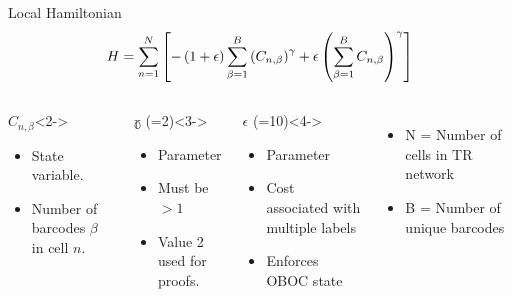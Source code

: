 \documentclass[10pt]{beamer}
\begin{document}
\begin{frame}{Local Hamiltonian}
    \begin{equation*}
        \centering
        H = \sum^{N}_{n=1} \left[
        - \left( 1 + \epsilon \right) \sum^{B}_{\beta=1}
        \left( C_{n , \beta} \right)^\gamma +
        \epsilon \left( \sum^{B}_{\beta=1} C_{n , \beta} \right)^\gamma
        \right]
    \end{equation*}
    \begin{columns}[T,onlytextwidth]
        \begin{exampleblock}{\centering $C_{n, \beta}$}<2->
            \begin{itemize}
                \item State variable.
                \item Number of barcodes $\beta$ in cell $n$.
            \end{itemize}
        \end{exampleblock}
        \begin{exampleblock}{\centering $\mathbb{\gamma}$ (=2)}<3->
            \begin{itemize}
                \item Parameter
                \item Must be $>1$
                \item Value 2 used for proofs.
            \end{itemize}
        \end{exampleblock}


        \begin{exampleblock}{\centering $\mathbb{\epsilon}$ (=10)}<4->
            \begin{itemize}
                \item Parameter
                \item Cost associated with multiple labels
                \item Enforces OBOC state
            \end{itemize}
        \end{exampleblock}
        \begin{itemize}
            \item<5-> N = Number of cells in TR network
            \item<5-> B = Number of unique barcodes
        \end{itemize}
    \end{columns}
\end{frame}
\end{document}
